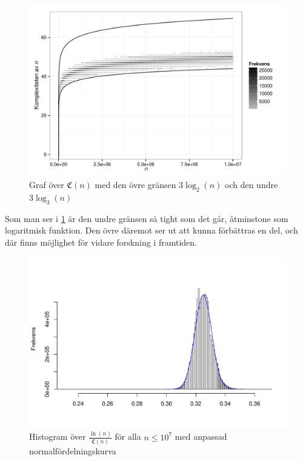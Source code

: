 \documentclass[a4paper,titlepage]{article}
\newcommand{\C}[1]{\mathfrak C \left( #1 \right)}
\theoremstyle{definition}
\begin{document}
    \begin{figure}[H]
        \includegraphics[width=\textwidth]{grafer/bounds}
        \caption{Graf över $\C{n}$ med den övre gränsen $3\log_2(n)$ och den undre $3\log_3(n)$}
        \label{bounds}
    \end{figure}

    Som man ser i \cref{bounds} är den undre gränsen så tight som det går, åtminstone som logaritmisk funktion. Den övre däremot ser ut att kunna
    förbättras en del, och där finns möjlighet för vidare forskning i framtiden.

    \begin{figure}[H]
        \includegraphics[width=\textwidth]{grafer/normhist}
        \caption{Histogram över $\frac{\ln(n)}{\C{n}}$ för alla $n\le10^7$ med anpassad normalfördelningskurva}
        \label{normhist}
    \end{figure}
\end{document}
